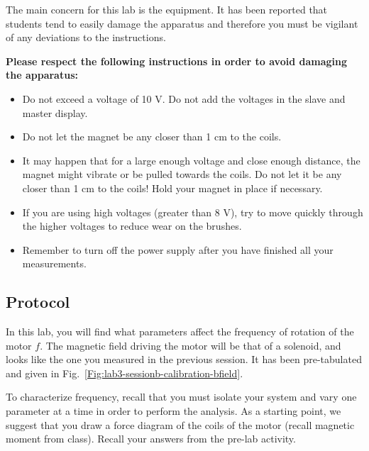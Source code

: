 \documentclass[12pt]{report}
\begin{document}

\begin{tcolorbox}
The main concern for this lab is the equipment. It has been reported that students tend to easily damage the apparatus and therefore you must be vigilant of any deviations to the instructions.
\end{tcolorbox}

\large \textbf{Please respect the following instructions in order to avoid damaging the apparatus:} \normalsize
\begin{itemize}
\item Do not exceed a voltage of 10 V. Do not add the voltages in the slave and master display.
\item Do not let the magnet be any closer than 1 cm to the coils.
\item It may happen that for a large enough voltage and close enough distance, the magnet might vibrate or be pulled towards the coils. Do not let it be any closer than 1 cm to the coils! Hold your magnet in place if necessary.
\item If you are using high voltages (greater than 8 V), try to move quickly through the higher voltages to reduce wear on the brushes.
\item Remember to turn off the power supply after you have finished all your measurements.
\end{itemize}


\subsection{Protocol}
In this lab, you will find what parameters affect the frequency of rotation of the motor $f$. The magnetic field driving the motor will be that of a solenoid, and looks like the one you measured in the previous session. It has been pre-tabulated and given in  Fig.~\ref{Fig:lab3-sessionb-calibration-bfield}.

To characterize frequency, recall that you must isolate your system and vary one parameter at a time in order to perform the analysis. As a starting point, we suggest that you draw a force diagram of the coils of the motor (recall magnetic moment from class). Recall your answers from the pre-lab activity.
\end{document}
